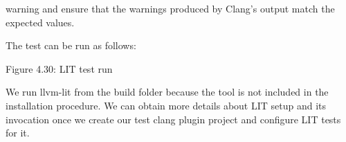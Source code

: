 warning and ensure that the warnings produced by Clang's output match the expected values.

The test can be run as follows:



\begin{center}
Figure 4.30: LIT test run
\end{center}

We run llvm-lit from the build folder because the tool is not included in the installation procedure. We can obtain more details about LIT setup and its invocation once we create our test clang plugin project and configure LIT tests for it.
















